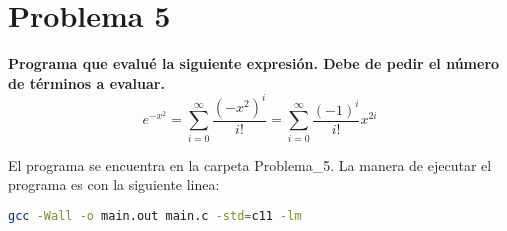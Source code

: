 \section*{Problema 5}
\textbf{Programa que evalué la siguiente expresión. Debe de pedir el número de términos a evaluar.}
\begin{equation*}
    e^{-x^2} = \sum_{i=0}^\infty \frac{(-x^2)^i}{i!} = \sum_{i=0}^\infty \frac{(-1)^i}{i!} x^{2i}
\end{equation*}

El programa se encuentra en la carpeta \textcolor{citecolor}{Problema\_5}. La manera de ejecutar el programa es con la siguiente linea:
\begin{lstlisting}[language=bash]
    gcc -Wall -o main.out main.c -std=c11 -lm
\end{lstlisting}